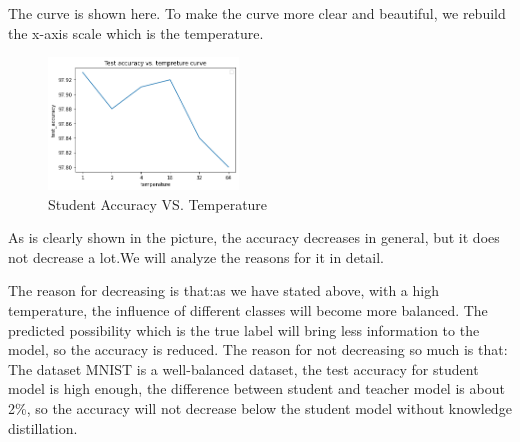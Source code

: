\documentclass[conference]{IEEEtran}
\begin{document}
  The curve is shown here. To make the curve more clear and beautiful, we rebuild the x-axis scale which is the temperature.
  \begin{figure}[h] 
      \centering
      \includegraphics[width=0.45\textwidth]{./graphs/accuracy_vs_temperature.png}
      \caption{Student Accuracy VS. Temperature}
      \label{Fig.t1q3e}
  \end{figure}
  As is clearly shown in the picture, the accuracy decreases in general, but it does not decrease a lot.We will analyze the reasons for it in detail.\par
  The reason for decreasing is that:as we have stated above, with a high temperature, the influence of different classes will become more balanced. The predicted possibility which is the true label will bring less information to the model, so the accuracy is reduced.
  The reason for not decreasing so much is that: The dataset MNIST is a well-balanced dataset, the test accuracy for student model is high enough, the difference between student and teacher model is about 2\%, so the accuracy will not decrease below the student model without knowledge distillation.
\end{document}
